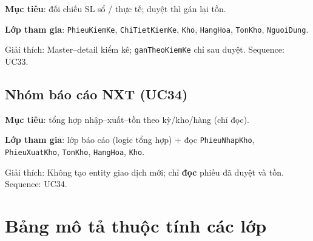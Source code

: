 \textbf{Mục tiêu}: đối chiếu SL sổ / thực tế; duyệt thì gán lại tồn.

\textbf{Lớp tham gia}: \texttt{PhieuKiemKe}, \texttt{ChiTietKiemKe}, \texttt{Kho}, \texttt{HangHoa}, \texttt{TonKho}, \texttt{NguoiDung}.



Giải thích: Master--detail kiểm kê; \texttt{ganTheoKiemKe} chỉ sau duyệt. Sequence: UC33.

\subsection{Nhóm báo cáo NXT (UC34)}

\textbf{Mục tiêu}: tổng hợp nhập--xuất--tồn theo kỳ/kho/hàng (chỉ đọc).

\textbf{Lớp tham gia}: lớp báo cáo (logic tổng hợp) + đọc \texttt{PhieuNhapKho}, \texttt{PhieuXuatKho}, \texttt{TonKho}, \texttt{HangHoa}, \texttt{Kho}.



Giải thích: Không tạo entity giao dịch mới; chỉ \textbf{đọc} phiếu đã duyệt và tồn. Sequence: UC34.

\section{Bảng mô tả thuộc tính các lớp}

